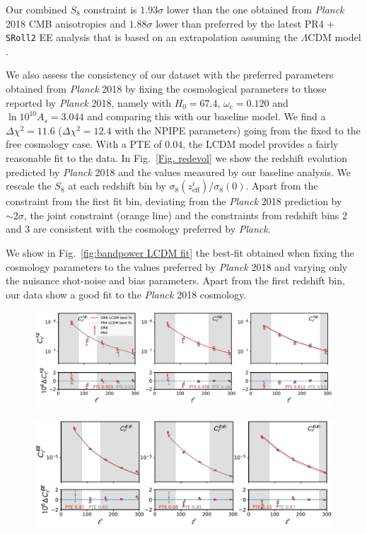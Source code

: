 \documentclass[twocolumn]{aastex631}
\begin{document}
{Our combined $S_8$ constraint is $1.93\sigma$ lower than the one obtained from \textit{Planck} 2018 CMB anisotropies \citep{Planck:2018vyg} and $1.88\sigma$ lower than preferred by the latest PR4 \citep{Rosenberg_2022} + \texttt{SRoll2} EE \citep{Pagano_2020} analysis that is based on an extrapolation assuming the $\Lambda$CDM model .

We also assess the consistency of our dataset with the preferred parameters obtained from \textit{Planck} 2018 by fixing the cosmological parameters to those reported by \textit{Planck} 2018, namely with $ H_0= 67.4$, $\omega_\mathrm{c}=0.120$ and $\ln{10^{10}A_s}=3.044$ and comparing this with our baseline model. We find a $\Delta\chi^2=11.6$  ($\Delta\chi^2=12.4$ with the NPIPE parameters) going from the fixed to the free cosmology case. With a PTE of 0.04, the LCDM model provides a fairly reasonable fit to the data. In Fig.~\ref{Fig. redevol} we show the redshift evolution predicted by \textit{Planck} 2018 and the values measured by our baseline analysis. We rescale the $S_8$ at each redshift bin by $\sigma_8(z^{i}_\mathrm{eff})/\sigma_8(0)$. Apart from the constraint from the first fit bin, deviating from the  \textit{Planck} 2018 prediction by $\sim 2\sigma$, the joint constraint (orange line) and the constraints from redshift bins 2 and 3 are consistent with the cosmology preferred by \textit{Planck}.


We show in Fig.~\ref{fig:bandpower LCDM fit} the best-fit obtained when fixing the cosmology parameters to the values preferred by \textit{Planck} 2018 and varying only the nuisance shot-noise and bias parameters. Apart from the first redshift bin, our data show a good fit to the \textit{Planck} 2018 cosmology.

\begin{figure}
    \centering
    \includegraphics[width=\linewidth]{figures/kg_best_LCDM.pdf} \\ %
    \vspace{-8pt} %
    
    \includegraphics[width=\linewidth]{figures/gg_best_LCDM.pdf} \\ %
    \vspace{-8pt} %
    

\end{figure}}
\end{document}
